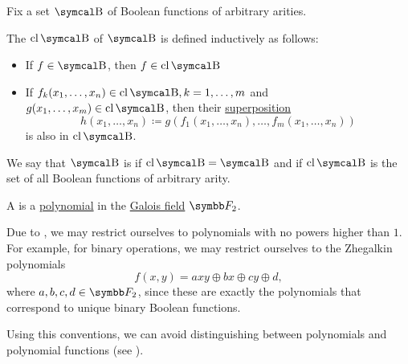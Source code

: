 \begin{definition}\label{def:boolean_closure}
  Fix a set \( \CB \) of Boolean functions of arbitrary arities.

  The  \( \Cl{\CB} \) of \( \CB \) is defined inductively as follows:
  \begin{itemize}
    \item If \( f \in \CB \), then \( f \in \Cl{\CB} \)
    \item If \( f_k(x_1, \ldots, x_n) \in \Cl{\CB}, k = 1, \ldots, m \) and \( g(x_1, \ldots, x_m) \in \Cl{\CB} \), then their \hyperref[def:function/superposition]{superposition}
    \begin{equation*}
      h(x_1, \ldots, x_n) \coloneqq g(f_1(x_1, \ldots, x_n), \ldots, f_m(x_1, \ldots, x_n))
    \end{equation*}
    is also in \( \Cl{\CB} \).
  \end{itemize}

  We say that \( \CB \) is  if \( \Cl{\CB} = \CB \) and  if \( \Cl{\CB} \) is the set of all Boolean functions of arbitrary arity.
\end{definition}

\begin{definition}\label{def:zhegalkin_polynomial}
  A  is a \hyperref[def:polynomial]{polynomial} in the \hyperref[thm:galois_field_existence]{Galois field} \( \BF_2 \).

  Due to , we may restrict ourselves to polynomials with no powers higher than \( 1 \). For example, for binary operations, we may restrict ourselves to the Zhegalkin polynomials
  \begin{equation}\label{eq:def:zhegalkin_polynomial/binary_polynomial}
    f(x, y) = axy \oplus bx \oplus cy \oplus d,
  \end{equation}
  where \( a, b, c, d \in \BF_2 \), since these are exactly the polynomials that correspond to unique binary Boolean functions.

  Using this conventions, we can avoid distinguishing between polynomials and polynomial functions (see ).
\end{definition}

